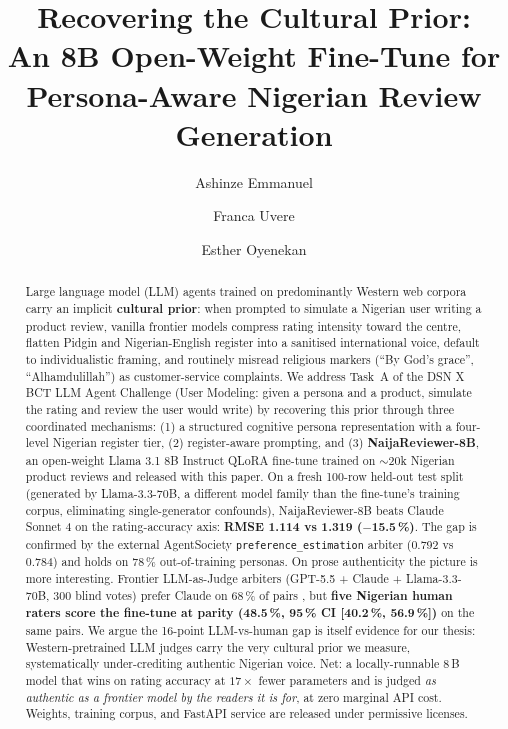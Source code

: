 \documentclass[sigconf,nonacm,balance]{acmart}
\title{Recovering the Cultural Prior:\\
       An 8B Open-Weight Fine-Tune for Persona-Aware Nigerian Review Generation}
\author{Ashinze Emmanuel}
\affiliation{\institution{International University of Applied Sciences}\country{Germany}}
\author{Franca Uvere}
\affiliation{\institution{University of Lagos}\country{Nigeria}}
\author{Esther Oyenekan}
\affiliation{\institution{MIVA Open University}\country{Nigeria}}
\begin{document}
\begin{abstract}
Large language model (LLM) agents trained on predominantly Western web corpora
carry an implicit \textbf{cultural prior}: when prompted to simulate a
Nigerian user writing a product review, vanilla frontier models compress
rating intensity toward the centre, flatten Pidgin and Nigerian-English
register into a sanitised international voice, default to individualistic
framing, and routinely misread religious markers (``By God's grace'',
``Alhamdulillah'') as customer-service complaints. We address Task~A of the
DSN X BCT LLM Agent Challenge (User Modeling: given a persona and a product,
simulate the rating and review the user would write) by recovering this
prior through three coordinated mechanisms: (1) a structured cognitive
persona representation with a four-level Nigerian register tier,
(2) register-aware prompting, and (3) \textbf{NaijaReviewer-8B}, an
open-weight Llama 3.1 8B Instruct QLoRA fine-tune trained on
$\sim$20k Nigerian product reviews and released with this paper.
On a fresh 100-row held-out test split (generated by Llama-3.3-70B,
a different model family than the fine-tune's training corpus, eliminating
single-generator confounds), NaijaReviewer-8B beats Claude Sonnet 4 on the
rating-accuracy axis: \textbf{RMSE 1.114 vs 1.319 ($-$15.5\,\%)}. The gap is
confirmed by the external AgentSociety \texttt{preference\_estimation}
arbiter (0.792 vs 0.784) and holds on 78\,\% out-of-training personas.
On prose authenticity the picture is more interesting. Frontier
LLM-as-Judge arbiters (GPT-5.5 + Claude + Llama-3.3-70B, 300 blind
votes) prefer Claude on 68\,\% of pairs , but \textbf{five Nigerian
human raters score the fine-tune at parity (48.5\,\%, 95\,\% CI
[40.2\,\%, 56.9\,\%])} on the same pairs. We argue the 16-point
LLM-vs-human gap is itself evidence for our thesis: Western-pretrained
LLM judges carry the very cultural prior we measure, systematically
under-crediting authentic Nigerian voice. Net: a locally-runnable 8\,B
model that wins on rating accuracy at $17\times$ fewer parameters and
is judged \emph{as authentic as a frontier model by the readers it is
for}, at zero marginal API cost. Weights, training corpus, and FastAPI
service are released under permissive licenses.
\end{abstract}

\maketitle

\end{document}
